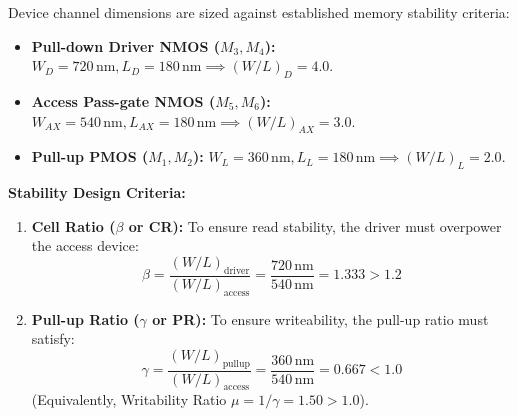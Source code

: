 \documentclass[conference]{IEEEtran}
\begin{document}
Device channel dimensions are sized against established memory stability criteria:
\begin{itemize}
    \item \textbf{Pull-down Driver NMOS ($M_3, M_4$):} $W_D = 720\,\text{nm}, L_D = 180\,\text{nm} \implies (W/L)_D = 4.0$.
    \item \textbf{Access Pass-gate NMOS ($M_5, M_6$):} $W_{AX} = 540\,\text{nm}, L_{AX} = 180\,\text{nm} \implies (W/L)_{AX} = 3.0$.
    \item \textbf{Pull-up PMOS ($M_1, M_2$):} $W_L = 360\,\text{nm}, L_L = 180\,\text{nm} \implies (W/L)_L = 2.0$.
\end{itemize}

\textbf{Stability Design Criteria:}
\begin{enumerate}
    \item \textbf{Cell Ratio ($\beta$ or CR):} To ensure read stability, the driver must overpower the access device:
    \begin{equation}
    \beta = \frac{(W/L)_{\text{driver}}}{(W/L)_{\text{access}}} = \frac{720\,\text{nm}}{540\,\text{nm}} = 1.333 > 1.2
    \end{equation}
    \item \textbf{Pull-up Ratio ($\gamma$ or PR):} To ensure writeability, the pull-up ratio must satisfy:
    \begin{equation}
    \gamma = \frac{(W/L)_{\text{pullup}}}{(W/L)_{\text{access}}} = \frac{360\,\text{nm}}{540\,\text{nm}} = 0.667 < 1.0
    \end{equation}
    (Equivalently, Writability Ratio $\mu = 1/\gamma = 1.50 > 1.0$).
\end{enumerate}
\end{document}
